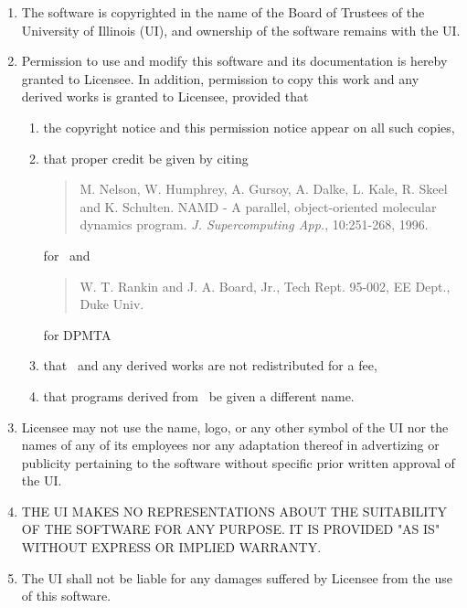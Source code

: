 \begin{enumerate}
\item The software is copyrighted in the name of the Board of Trustees
of the University of Illinois (UI), and ownership of the software
remains with the UI.

\item Permission to use and modify this software and its documentation
is hereby granted  to Licensee.  In addition,
permission to copy this work and any derived works is
granted to Licensee, provided that

\begin{enumerate}
\item the copyright notice and this permission notice appear on
all such copies, 
\item that proper credit be given by citing

\begin{quotation}
         \noindent M. Nelson, W. Humphrey, A. Gursoy, A. Dalke,
	 L. Kale, R. Skeel and K. Schulten.
	 NAMD - A parallel, object-oriented molecular dynamics program.
	 {\it J. Supercomputing App.}, 10:251-268, 1996.
\end{quotation}

\noindent for \NAMD\ and

\begin{quotation}
	 \noindent W. T. Rankin and J. A. Board, Jr., Tech Rept. 95-002,
	 EE Dept., Duke Univ.
\end{quotation}

\noindent for DPMTA
\item that \NAMD\ and any derived works are not redistributed for a fee,
\item that programs derived from \NAMD\ be given a different name.
\end{enumerate}

\item Licensee may not use the name, logo, or any other symbol of the UI
    nor the names of any of its employees nor any adaptation thereof in
    advertizing or publicity pertaining to the software without specific
    prior written approval of the UI.

\item THE UI MAKES NO REPRESENTATIONS ABOUT THE SUITABILITY OF THE
    SOFTWARE FOR ANY PURPOSE.  IT IS PROVIDED "AS IS" WITHOUT EXPRESS
    OR IMPLIED WARRANTY.

\item The UI shall not be liable for any damages suffered by Licensee from
    the use of this software.
\end{enumerate}

